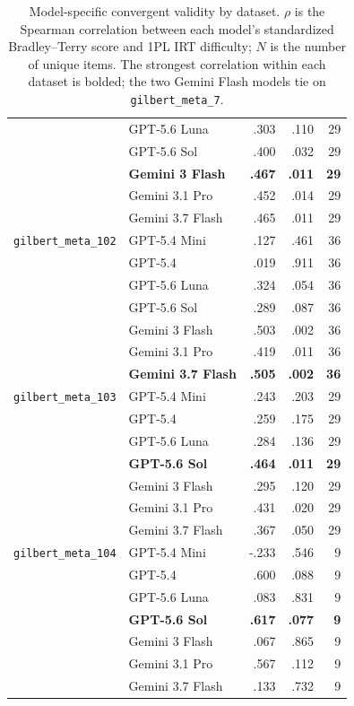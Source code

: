 \documentclass[11pt]{article}
\begin{document}
\begin{table}[p]
\begin{tabular}{llrrr}
      & GPT-5.6 Luna       & .303  & .110 & 29 \\
      & GPT-5.6 Sol        & .400  & .032 & 29 \\
      & \textbf{Gemini 3 Flash} & \textbf{.467} & \textbf{.011} & \textbf{29} \\
      & Gemini 3.1 Pro     & .452  & .014 & 29 \\
      & Gemini 3.7 Flash   & .465  & .011 & 29 \\
    \addlinespace
    \texttt{gilbert\_meta\_102}
      & GPT-5.4 Mini       & .127  & .461 & 36 \\
      & GPT-5.4            & .019  & .911 & 36 \\
      & GPT-5.6 Luna       & .324  & .054 & 36 \\
      & GPT-5.6 Sol        & .289  & .087 & 36 \\
      & Gemini 3 Flash     & .503  & .002 & 36 \\
      & Gemini 3.1 Pro     & .419  & .011 & 36 \\
      & \textbf{Gemini 3.7 Flash} & \textbf{.505} & \textbf{.002} & \textbf{36} \\
    \addlinespace
    \texttt{gilbert\_meta\_103}
      & GPT-5.4 Mini       & .243  & .203 & 29 \\
      & GPT-5.4            & .259  & .175 & 29 \\
      & GPT-5.6 Luna       & .284  & .136 & 29 \\
      & \textbf{GPT-5.6 Sol} & \textbf{.464} & \textbf{.011} & \textbf{29} \\
      & Gemini 3 Flash     & .295  & .120 & 29 \\
      & Gemini 3.1 Pro     & .431  & .020 & 29 \\
      & Gemini 3.7 Flash   & .367  & .050 & 29 \\
    \addlinespace
    \texttt{gilbert\_meta\_104}
      & GPT-5.4 Mini       & -.233 & .546 & 9 \\
      & GPT-5.4            & .600  & .088 & 9 \\
      & GPT-5.6 Luna       & .083  & .831 & 9 \\
      & \textbf{GPT-5.6 Sol} & \textbf{.617} & \textbf{.077} & \textbf{9} \\
      & Gemini 3 Flash     & .067  & .865 & 9 \\
      & Gemini 3.1 Pro     & .567  & .112 & 9 \\
      & Gemini 3.7 Flash   & .133  & .732 & 9 \\
    \bottomrule
  \end{tabular}
  \caption{Model-specific convergent validity by dataset. $\rho$ is the Spearman correlation between each model's standardized Bradley--Terry score and 1PL IRT difficulty; $N$ is the number of unique items. The strongest correlation within each dataset is bolded; the two Gemini Flash models tie on \texttt{gilbert\_meta\_7}.}
  \label{tab:model_spearman_dataset}
\end{table}
\end{document}
